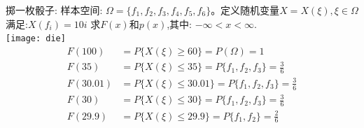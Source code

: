 \begin{frame}[shrink]
掷一枚骰子: 样本空间: $\Omega=\{f_1,f_2,f_3,f_4,f_5,f_6\}$。定义随机变量$X=X(\xi),\xi\in \Omega$满足:$X(f_i)=10i$
求$F(x)$和$p(x)$,其中: $-\infty<x<\infty$.\\
\texttt{[image: die]}
\begin{align*}
F(100)&=P\{X(\xi)\ge 60 \}=P(\Omega)=1\\
F(35)&=P\{X(\xi)\le 35 \}=P\{f_1,f_2,f_3 \}=\frac{3}{6} \\
F(30.01)&=P\{X(\xi)\le 30.01 \}=P\{f_1,f_2,f_3 \}=\frac{3}{6} \\
F(30)&=P\{X(\xi)\le 30 \}=P\{f_1,f_2,f_3 \}=\frac{3}{6} \\
F(29.9)&=P\{X(\xi)\le 29.9 \}=P\{f_1,f_2 \}=\frac{2}{6} \\
\end{align*}
\end{frame}




